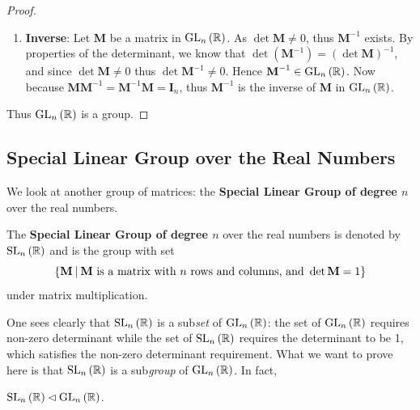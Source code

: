 \begin{proof}
\begin{enumerate}
        \item \textbf{Inverse}: Let \textbf{M} be a matrix in $\mathrm{GL}_{n}\left(\mathbb{R}\right)$. As $\det \textbf{M} \neq 0$, thus $\textbf{M}^{-1}$ exists. By properties of the determinant, we know that $\det \left(\textbf{M}^{-1}\right) = \left(\det \textbf{M}\right)^{-1}$, and since $\det \textbf{M} \neq 0$ thus $\det \textbf{M}^{-1} \neq 0$. Hence $\textbf{M}^{-1} \in \mathrm{GL}_{n}\left(\mathbb{R}\right)$. Now because $\textbf{MM}^{-1} = \textbf{M}^{-1}\textbf{M} = \textbf{I}_n$, thus $\textbf{M}^{-1}$ is the inverse of \textbf{M} in $\mathrm{GL}_{n}\left(\mathbb{R}\right)$.
    \end{enumerate}
    Thus $\mathrm{GL}_{n}\left(\mathbb{R}\right)$ is a group.
\end{proof}

\subsection{Special Linear Group over the Real Numbers}
We look at another group of matrices: the \textbf{Special Linear Group of degree $n$} over the real numbers.
\begin{definition}
    The \textbf{Special Linear Group of degree $n$} over the real numbers is denoted by $\mathrm{SL}_{n}\left(\mathbb{R}\right)$ and is the group with set
    \[
        \left\{\textbf{M} \vert \text{\textbf{M} is a matrix with } n \text{ rows and columns, and } \det \textbf{M} = 1\right\}
    \]
    under matrix multiplication.
\end{definition}
One sees clearly that $\mathrm{SL}_{n}\left(\mathbb{R}\right)$ is a sub\textit{set} of $\mathrm{GL}_{n}\left(\mathbb{R}\right)$: the set of $\mathrm{GL}_{n}\left(\mathbb{R}\right)$ requires non-zero determinant while the set of $\mathrm{SL}_{n}\left(\mathbb{R}\right)$ requires the determinant to be 1, which satisfies the non-zero determinant requirement. What we want to prove here is that $\mathrm{SL}_{n}\left(\mathbb{R}\right)$ is a sub\textit{group} of $\mathrm{GL}_{n}\left(\mathbb{R}\right)$. In fact,
\begin{proposition}
    $\mathrm{SL}_{n}\left(\mathbb{R}\right) \lhd \mathrm{GL}_{n}\left(\mathbb{R}\right)$.
\end{proposition}
